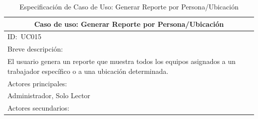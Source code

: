 \documentclass[stu, 12pt, letterpaper, donotrepeattitle, floatsintext, natbib]{apa7}
\begin{document}
\begin{longtable}{@{} p{16.5cm} @{}}
    \caption{Especificación de Caso de Uso: Generar Reporte por Persona/Ubicación}\label{tab:UC015}                                                                                                                                                                            \\ \toprule
    \multicolumn{1}{c}{Caso de uso: Generar Reporte por Persona/Ubicación}                                                                                                                                                                                                     \\ \midrule
    ID:~UC015                                                                                                                                                                                                                                                                  \\ \midrule
    Breve descripción:                                                                                                                                                                                                                                                         \\
    El usuario genera un reporte que muestra todos los equipos asignados a un trabajador específico o a una ubicación determinada.                                                                                                                                             \\ \midrule
    Actores principales:                                                                                                                                                                                                                                                       \\
    Administrador, Solo Lector                                                                                                                                                                                                                                                 \\ \midrule
    Actores secundarios:                                                                                                                                                                                                                                                       \\

\end{longtable}
\end{document}
